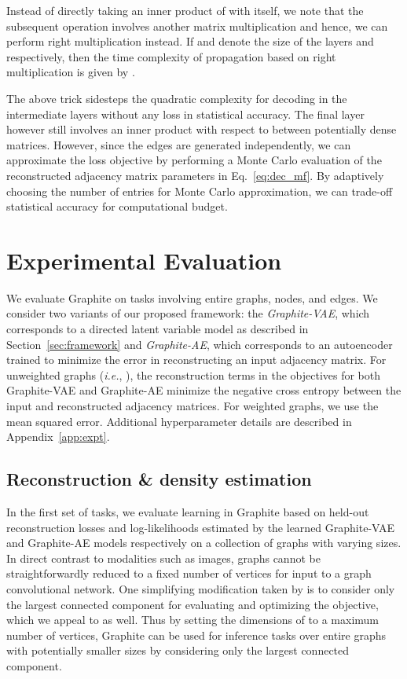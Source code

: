 \documentclass{article}
\newcommand{\name}{Graphite}
\begin{document}
Instead of directly taking an inner product of  with itself, we note that the subsequent operation involves another matrix multiplication and hence, we can perform right multiplication instead.
If  and  denote the size of the layers  and  respectively, then the time complexity of propagation based on right multiplication is given by . 

The above trick sidesteps the quadratic  complexity for decoding in the intermediate layers without any loss in statistical accuracy. The final layer however still involves an inner product with respect to  between potentially dense matrices. However, since the edges are generated independently, we can approximate the loss objective by performing a Monte Carlo evaluation of the reconstructed adjacency matrix parameters in Eq.~\eqref{eq:dec_mf}. By adaptively choosing the number of entries for Monte Carlo approximation, we can trade-off statistical accuracy for computational budget.  
\section{Experimental Evaluation}\label{sec:exps}

We evaluate \name{} on tasks involving entire graphs, nodes, and edges. 
We consider two variants of our proposed framework: the \textit{\name{}-VAE}, which corresponds to a directed latent variable model as described in Section~\ref{sec:framework} and \textit{\name{}-AE}, which corresponds to an autoencoder trained to minimize the error in reconstructing an input adjacency matrix. For unweighted graphs (\textit{i.e.}, ), the reconstruction terms in the objectives for both \name{}-VAE and \name{}-AE minimize the negative cross entropy between the input and reconstructed adjacency matrices. For weighted graphs, we use the mean squared error. Additional hyperparameter details are described in Appendix~\ref{app:expt}.


\subsection{Reconstruction \& density estimation}

In the first set of tasks, we evaluate learning in \name{} based on held-out reconstruction losses and log-likelihoods estimated by the learned \name{}-VAE and \name{}-AE models respectively on a collection of graphs with varying sizes. In direct contrast to modalities such as images, graphs cannot be straightforwardly reduced to a fixed number of vertices for input to a graph convolutional network. One simplifying modification taken by \citet{bojchevski2018netgan} is to consider only the largest connected component for evaluating and optimizing the objective, which we appeal to as well.  Thus by setting the dimensions of  to a maximum number of vertices, \name{} can be used for inference tasks over entire graphs with potentially smaller sizes by considering only the largest connected component.
\end{document}
